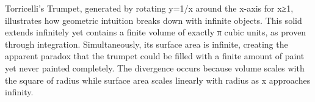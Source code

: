 Torricelli's Trumpet, generated by rotating y=1/x around the x-axis for x≥1, illustrates how geometric intuition breaks down with infinite objects. This solid extends infinitely yet contains a finite volume of exactly π cubic units, as proven through integration. Simultaneously, its surface area is infinite, creating the apparent paradox that the trumpet could be filled with a finite amount of paint yet never painted completely. The divergence occurs because volume scales with the square of radius while surface area scales linearly with radius as x approaches infinity.
